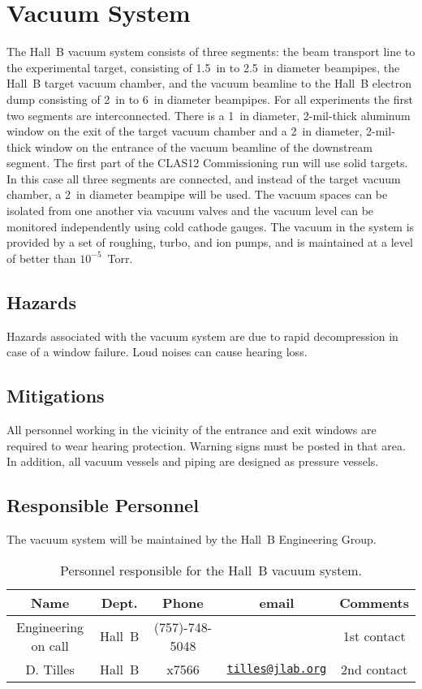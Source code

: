 \section{Vacuum System}

The Hall~B vacuum system consists of three segments: the beam transport line to the 
experimental target, consisting of 1.5~in to 2.5~in diameter beampipes, the Hall~B 
target vacuum chamber, and the vacuum beamline to the Hall~B electron dump consisting of 
2~in to 6~in diameter beampipes. For all experiments the first two segments are 
interconnected. There is a 1~in diameter, 2-mil-thick aluminum window on the exit of the 
target vacuum chamber and a 2~in diameter, 2-mil-thick window on the entrance of the 
vacuum beamline of the downstream segment. The first part of the CLAS12 Commissioning run 
will use solid targets. In this case all three segments are connected, and instead of the 
target vacuum chamber, a 2~in diameter beampipe will be used. The vacuum spaces can be 
isolated from one another via vacuum valves and the vacuum level can be monitored 
independently using cold cathode gauges. The vacuum in the system is provided by a set of 
roughing, turbo, and ion pumps, and is maintained at a level of better than 
$10^{-5}$~Torr. 

\subsection{Hazards} 

Hazards associated with the vacuum system are due to rapid decompression in case of a window 
failure. Loud noises can cause hearing loss. 

\subsection{Mitigations}

All personnel working in the vicinity of the entrance and exit windows are required to wear 
hearing protection. Warning signs must be posted in that area. In addition, all vacuum vessels 
and piping are designed as pressure vessels.   

\subsection{Responsible Personnel}

The vacuum system will be maintained by the Hall~B Engineering Group.  

\begin{table}[!htb]
\centering
\begin{tabular}{|c|c|c|c|c|} \hline
Name&Dept.&Phone&email&Comments \\ \hline
Engineering on call & Hall~B& (757)-748-5048&& 1st contact  \\ \hline
D. Tilles & Hall~B & x7566&\href{mailto:tilles@jlab.org}{\nolinkurl{tilles@jlab.org}}&2nd contact \\ \hline
 \end{tabular}
\caption{Personnel responsible for the Hall~B vacuum system.} 
\label{tb:vacuum}
\end{table}

